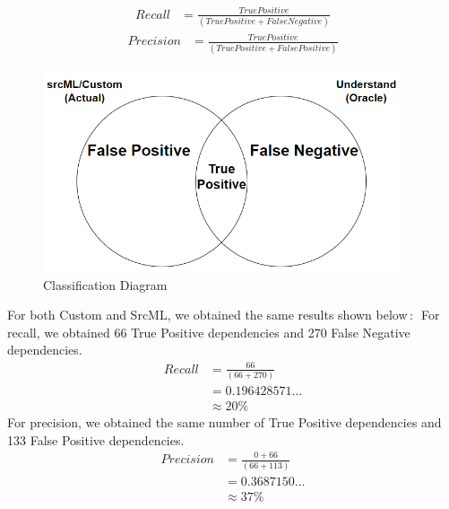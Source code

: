 \documentclass[12pt, dvipsnames, a4paper]{article}
\begin{document}
\begin{equation*}
	\begin{split}
		Recall &= \frac{True Positive}{(True Positive + False Negative)}
	\end{split}
\end{equation*}
\newline
\begin{equation*}
	\begin{split}
		Precision &= \frac{True Positive}{(True Positive + False Positive)}
	\end{split}
\end{equation*}

\begin{figure}[h]
	\center
	\includegraphics[width=300pt]{assets/recall_precision_diagram.PNG}
	\caption{Classification Diagram}
\end{figure}

For both Custom and SrcML, we obtained the same results shown below$\,\colon\,$
\newline
For recall, we obtained 66 True Positive dependencies and 270 False Negative dependencies.
\begin{equation*}
	\begin{split}
		Recall &= \frac{66}{(66 + 270)}\\
		&= 0.196428571\dots\\
		&\approx 20\%
	\end{split}
\end{equation*}
For precision, we obtained the same number of True Positive dependencies and 133 False Positive dependencies.
\begin{equation*}
	\begin{split}
		Precision &= \frac{0 + 66}{(66 + 113)}\\
		&= 0.3687150\dots\\
		&\approx 37\%
	\end{split}
\end{equation*}
\clearpage
\end{document}
